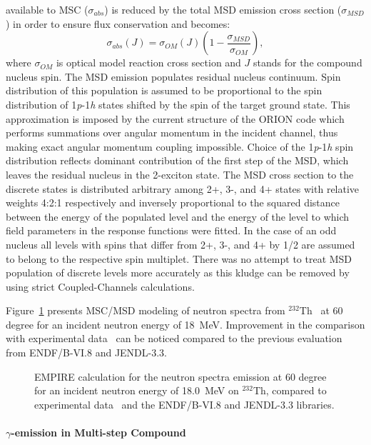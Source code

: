 \documentclass[twocolumn,amsmath,amssymb,10pt,groupedaddress,letter]{revtex4}
\begin{document}
available to MSC ($\sigma_{abs}$) is reduced by the total MSD emission
cross section ($\sigma_{MSD}$) in order to ensure flux conservation
and becomes:
\begin{equation}
\sigma_{abs}(J)=\sigma_{OM}(J)\left(1-\frac{\sigma_{MSD}}{\sigma_{OM}}\right),\label{CNabs}\end{equation}
\noindent where $\sigma_{OM}$ is optical model reaction cross section
and $J$ stands for the compound nucleus spin.
The MSD emission populates residual nucleus continuum.
Spin distribution of this population is assumed to be proportional
to the spin distribution of 1\emph{p}-1\emph{h} states shifted by
the spin of the target ground state. This approximation is imposed
by the current structure of the ORION code which performs
summations over angular momentum in the incident channel, thus making
exact angular momentum coupling impossible. Choice of the 1\emph{p}-1\emph{h}
spin distribution reflects dominant contribution of the first step
of the MSD, which leaves the residual nucleus in the 2-exciton
state.
The MSD cross section to the discrete states is distributed
arbitrary among 2+, 3-, and 4+ states with relative weights 4:2:1
respectively and inversely proportional to the squared distance between
the energy of the populated level and the energy of the level to which
field parameters in the response functions were fitted. In the case
of an odd nucleus all levels with spins that differ from 2+, 3-, and
4+ by 1/2 are assumed to belong to the respective spin multiplet.
There was no attempt to treat MSD population of discrete
levels more accurately as this kludge can be removed by using strict
Coupled-Channels calculations.

Figure~\ref{thoriumMSD} presents MSC/MSD modeling of neutron spectra from $^{232}$Th~\cite{crp} at
60 degree for an incident neutron energy of 18~MeV. Improvement in the comparison
with experimental data~\cite{mats} can be noticed compared to the previous evaluation from
ENDF/B-VI.8 and JENDL-3.3.
\begin{figure}[htbp]
\caption{EMPIRE calculation for the neutron spectra emission at 60 degree for an incident neutron
 energy of 18.0~MeV on $^{232}$Th, compared to experimental data~\cite{mats} and the ENDF/B-VI.8 and
JENDL-3.3 libraries.}
\label{thoriumMSD}
\end{figure}

\medskip
\paragraph{$\gamma$-emission in Multi-step Compound}
\end{document}
